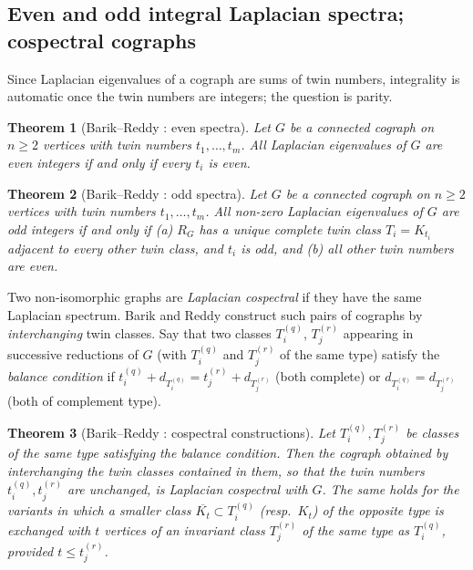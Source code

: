 \documentclass[11pt]{article}
\theoremstyle{plain}
\newtheorem{theorem}{Theorem}[section]
\theoremstyle{definition}
\theoremstyle{remark}
\begin{document}
	\subsection{Even and odd integral Laplacian spectra; cospectral cographs}
	\label{sub:evenodd}
	
	Since Laplacian eigenvalues of a cograph are sums of twin numbers, integrality is automatic once the twin numbers are integers; the question is parity.
	
	\begin{theorem}[Barik--Reddy \cite{BarikReddy2023}: even spectra]
		\label{thm:BR-even}
		Let $G$ be a connected cograph on $n\ge2$ vertices with twin numbers $t_1,\dots,t_m$. All Laplacian eigenvalues of $G$ are even integers if and only if every $t_i$ is even.
	\end{theorem}
	
	\begin{theorem}[Barik--Reddy \cite{BarikReddy2023}: odd spectra]
		\label{thm:BR-odd}
		Let $G$ be a connected cograph on $n\ge2$ vertices with twin numbers $t_1,\dots,t_m$. All non-zero Laplacian eigenvalues of $G$ are odd integers if and only if (a) $R_G$ has a unique complete twin class $T_i=K_{t_i}$ adjacent to every other twin class, and $t_i$ is odd, and (b) all other twin numbers are even.
	\end{theorem}
	
	Two non-isomorphic graphs are \emph{Laplacian cospectral} if they have the same Laplacian spectrum. Barik and Reddy construct such pairs of cographs by \emph{interchanging} twin classes. Say that two classes $T^{(q)}_i$, $T^{(r)}_j$ appearing in successive reductions of $G$ (with $T_i^{(q)}$ and $T_j^{(r)}$ of the same type) satisfy the \emph{balance condition} if $t_i^{(q)}+d_{T_i^{(q)}}=t_j^{(r)}+d_{T_j^{(r)}}$ (both complete) or $d_{T_i^{(q)}}=d_{T_j^{(r)}}$ (both of complement type).
	
	\begin{theorem}[Barik--Reddy \cite{BarikReddy2023}: cospectral constructions]
		\label{thm:BR-cospectral}
		Let $T_i^{(q)},T_j^{(r)}$ be classes of the same type satisfying the balance condition. Then the cograph obtained by interchanging the twin classes contained in them, so that the twin numbers $t_i^{(q)},t_j^{(r)}$ are unchanged, is Laplacian cospectral with $G$. The same holds for the variants in which a smaller class $\overline{K_{t}}\subset T_i^{(q)}$ (resp.\ $K_t$) of the opposite type is exchanged with $t$ vertices of an invariant class $T_j^{(r)}$ of the same type as $T_i^{(q)}$, provided $t\le t_j^{(r)}$.
	\end{theorem}
	
\end{document}
